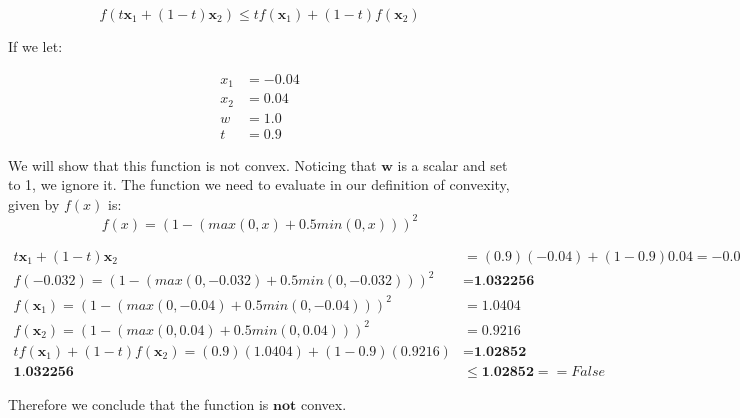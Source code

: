\documentclass{article}
\begin{document}
\begin{equation}
f ( t\mathbf{x}_1 + (1 - t)\mathbf{x}_2) \leq tf ( \mathbf{x}_1) + (1 - t)f(\mathbf{x}_2)
\end{equation}

If we let:

\begin{equation}
\begin{aligned}
x_1 &= -0.04 \\
x_2 &= 0.04 \\
w &= 1.0 \\
t &= 0.9
\end{aligned}
\end{equation}

We will show that this function is not convex.  Noticing that $\mathbf{w}$ is a scalar and set to 1, we ignore it.  The function we need to evaluate in our definition of convexity, given by $f(x)$ is:
\begin{equation}
f(x) = (1 - (max(0, x) + 0.5 min(0, x)))^2
\end{equation}

\begin{equation}
\begin{aligned}
t\mathbf{x}_1 + (1 - t)\mathbf{x}_2 &= (0.9)(-0.04) + (1 - 0.9)0.04 = -0.032 \\
f(-0.032) = (1 - (max(0, -0.032) + 0.5 min(0, -0.032)))^2 &= \textbf{1.032256} \\
f(\mathbf{x}_1) = (1 - (max(0, -0.04) + 0.5 min(0, -0.04)))^2 &= 1.0404 \\
f(\mathbf{x}_2) = (1 - (max(0, 0.04) + 0.5 min(0, 0.04)))^2 &= 0.9216 \\
tf(\mathbf{x}_1) + (1 - t)f(\mathbf{x}_2) = (0.9)(1.0404) + (1 - 0.9)(0.9216) &= \textbf{1.02852} \\
\textbf{1.032256} &\leq \textbf{1.02852} == False
\end{aligned}
\end{equation}

Therefore we conclude that the function is $\textbf{not}$ convex.
\end{document}
